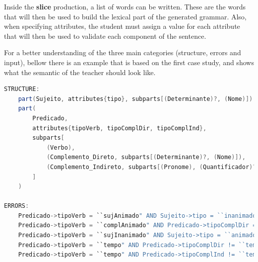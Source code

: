 Inside the \textbf{slice} production, a list of words can be written. These are the words that will then be used to build the lexical part of the generated grammar. Also, when specifying attributes, the student must assign a value for each attribute that will then be used to validate each component of the sentence.

For a better understanding of the three main categories (structure, errors and input), bellow there is an example that is based on the first case study, and shows what the semantic of the teacher should look like.
\newpage

\begin{center}
\begin{minipage}{13cm}
\begin{lstlisting}[language=java, basicstyle=\tiny, label={lst:meta_struct_err}, caption=Example of a possible sentence structure]
STRUCTURE:
    part(Sujeito, attributes{tipo}, subparts[(Determinante)?, (Nome)])
    part(
        Predicado,
        attributes{tipoVerb, tipoComplDir, tipoComplInd},
        subparts[
            (Verbo),
            (Complemento_Direto, subparts[(Determinante)?, (Nome)]),
            (Complemento_Indireto, subparts[(Pronome), (Quantificador)?, (Nome)])?
        ]
    )

ERRORS:
    Predicado->tipoVerb = ``sujAnimado" AND Sujeito->tipo = ``inanimado";
    Predicado->tipoVerb = ``complAnimado" AND Predicado->tipoComplDir = ``inanimado";
    Predicado->tipoVerb = ``sujInanimado" AND Sujeito->tipo = ``animado";
    Predicado->tipoVerb = ``tempo" AND Predicado->tipoComplDir != ``tempo" AND Predicado->tipoComplDir != ``null";
    Predicado->tipoVerb = ``tempo" AND Predicado->tipoComplInd != ``tempo" AND Predicado->tipoComplInd != ``null";
\end{lstlisting}
\end{minipage}
\end{center}

%


